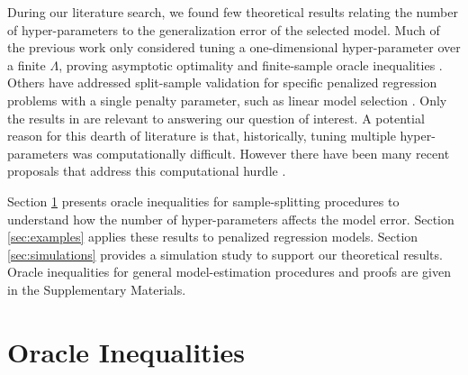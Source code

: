 \documentclass[12pt]{article} %
\theoremstyle{definition}
\begin{document}
During our literature search, we found few theoretical results relating the number of hyper-parameters to the generalization error of the selected model. 
Much of the previous work only considered tuning a one-dimensional hyper-parameter over a finite $\Lambda$, proving asymptotic optimality \citep{van2004asymptotic} and finite-sample oracle inequalities \citep{van2003unified, gyorfi2006distribution}. Others have addressed split-sample validation for specific penalized regression problems with a single penalty parameter, such as linear model selection \citep{li1987asymptotic, shao1997asymptotic, golub1979generalized, chetverikov2016cross, chatterjee2015prediction}.
Only the results in \citet{lecue2012oracle} are relevant to answering our question of interest. A potential reason for this dearth of literature is that, historically, tuning multiple hyper-parameters was computationally difficult.
However there have been many recent proposals that address this computational hurdle \citep{bengio2000gradient, foo2008efficient, snoek2012practical}.

Section \ref{sec:main_results} presents oracle inequalities for sample-splitting procedures to understand how the number of hyper-parameters affects the model error.
Section \ref{sec:examples} applies these results to penalized regression models.
Section \ref{sec:simulations} provides a simulation study to support our theoretical results.
Oracle inequalities for general model-estimation procedures and proofs are given in the Supplementary Materials.



\section{Oracle Inequalities} \label{sec:main_results}
\end{document}
